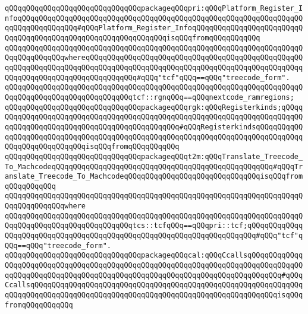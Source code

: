 \newline
\verb|qQQqqQQqqQQqqQQqqQQqqQQqqQQqqQQqpackageqQQqpri:qQQqPlatform_Register_InfoqQQqqQQqqQQqqQQqqQQqqQQqqQQqqQQqqQQqqQQqqQQqqQQqqQQqqQQqqQQqqQQqqQQqqQQqqQQqqQQqqQQq#qQQqPlatform_Register_InfoqQQqqQQqqQQqqQQqqQQqqQQqqQQqqQQqqQQqqQQqqQQqqQQqqQQqqQQqqQQqqQQqisqQQqfromqQQqqQQqqQQq|\newline
\verb|qQQqqQQqqQQqqQQqqQQqqQQqqQQqqQQqqQQqqQQqqQQqqQQqqQQqqQQqqQQqqQQqqQQqqQQqqQQqqQQqqQQqwhereqQQqqQQqqQQqqQQqqQQqqQQqqQQqqQQqqQQqqQQqqQQqqQQqqQQqqQQqqQQqqQQqqQQqqQQqqQQqqQQqqQQqqQQqqQQqqQQqqQQqqQQqqQQqqQQqqQQqqQQqqQQqqQQqqQQqqQQqqQQqqQQqqQQqqQQq#qQQq"tcf"qQQq==qQQq"treecode_form".|\newline
\verb|qQQqqQQqqQQqqQQqqQQqqQQqqQQqqQQqqQQqqQQqqQQqqQQqqQQqqQQqqQQqqQQqqQQqqQQqqQQqqQQqqQQqqQQqqQQqqQQqqQQqtcf::rgnqQQq==qQQqnextcode_ramregions;|\newline
\newline
\verb|qQQqqQQqqQQqqQQqqQQqqQQqqQQqqQQqpackageqQQqrgk:qQQqRegisterkinds;qQQqqQQqqQQqqQQqqQQqqQQqqQQqqQQqqQQqqQQqqQQqqQQqqQQqqQQqqQQqqQQqqQQqqQQqqQQqqQQqqQQqqQQqqQQqqQQqqQQqqQQqqQQqqQQqqQQq#qQQqRegisterkindsqQQqqQQqqQQqqQQqqQQqqQQqqQQqqQQqqQQqqQQqqQQqqQQqqQQqqQQqqQQqqQQqqQQqqQQqqQQqqQQqqQQqqQQqqQQqqQQqqQQqisqQQqfromqQQqqQQqqQQq|\newline
\newline
\verb|qQQqqQQqqQQqqQQqqQQqqQQqqQQqqQQqpackageqQQqt2m:qQQqTranslate_Treecode_To_MachcodeqQQqqQQqqQQqqQQqqQQqqQQqqQQqqQQqqQQqqQQqqQQqqQQqqQQq#qQQqTranslate_Treecode_To_MachcodeqQQqqQQqqQQqqQQqqQQqqQQqqQQqqQQqisqQQqfromqQQqqQQqqQQq|\newline
\verb|qQQqqQQqqQQqqQQqqQQqqQQqqQQqqQQqqQQqqQQqqQQqqQQqqQQqqQQqqQQqqQQqqQQqqQQqqQQqqQQqqQQqwhere|\newline
\verb|qQQqqQQqqQQqqQQqqQQqqQQqqQQqqQQqqQQqqQQqqQQqqQQqqQQqqQQqqQQqqQQqqQQqqQQqqQQqqQQqqQQqqQQqqQQqqQQqqQQqtcs::tcfqQQq==qQQqpri::tcf;qQQqqQQqqQQqqQQqqQQqqQQqqQQqqQQqqQQqqQQqqQQqqQQqqQQqqQQqqQQqqQQqqQQqqQQq#qQQq"tcf"qQQq==qQQq"treecode_form".|\newline
\newline
\verb|qQQqqQQqqQQqqQQqqQQqqQQqqQQqqQQqpackageqQQqcal:qQQqCcallsqQQqqQQqqQQqqQQqqQQqqQQqqQQqqQQqqQQqqQQqqQQqqQQqqQQqqQQqqQQqqQQqqQQqqQQqqQQqqQQqqQQqqQQqqQQqqQQqqQQqqQQqqQQqqQQqqQQqqQQqqQQqqQQqqQQqqQQqqQQqqQQqqQQq#qQQqCcallsqQQqqQQqqQQqqQQqqQQqqQQqqQQqqQQqqQQqqQQqqQQqqQQqqQQqqQQqqQQqqQQqqQQqqQQqqQQqqQQqqQQqqQQqqQQqqQQqqQQqqQQqqQQqqQQqqQQqqQQqqQQqqQQqisqQQqfromqQQqqQQqqQQq|\newline

